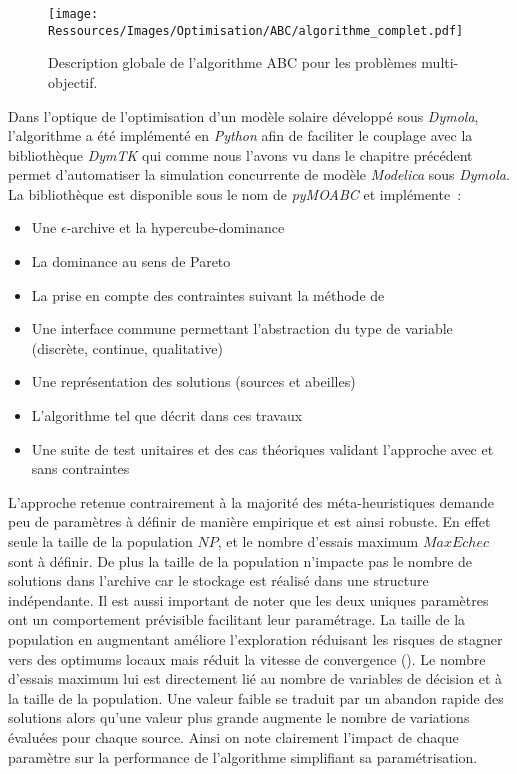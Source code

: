 \begin{figure}
    \centering
    \texttt{[image: Ressources/Images/Optimisation/ABC/algorithme\_complet.pdf]}
    \caption{Description globale de l’algorithme ABC pour les problèmes multi-objectif.}
    \label{fig:abc_complet}
\end{figure}

Dans l’optique de l’optimisation d’un modèle solaire développé sous \textit{Dymola}, l’algorithme
a été implémenté en \textit{Python} afin de faciliter le couplage avec la bibliothèque
\textit{DymTK} qui comme nous l’avons vu dans le chapitre précédent permet d’automatiser
la simulation concurrente de modèle \textit{Modelica} sous \textit{Dymola}. La bibliothèque est
disponible sous le nom de \textit{pyMOABC} et implémente~:
\begin{itemize}
  \item Une $\epsilon$-archive et la hypercube-dominance
  \item La dominance au sens de Pareto
  \item La prise en compte des contraintes suivant la méthode de \textcite{Woldesenbet20073077}
  \item Une interface commune permettant l’abstraction du type de variable (discrète, continue, qualitative)
  \item Une représentation des solutions (sources et abeilles)
  \item L’algorithme tel que décrit dans ces travaux
  \item Une suite de test unitaires et des cas théoriques validant l’approche avec
        et sans contraintes
\end{itemize}

L’approche retenue contrairement à la majorité des méta-heuristiques demande
peu de paramètres à définir de manière empirique et est ainsi robuste. En effet
seule la taille de la population $NP$, et le nombre d’essais maximum $MaxEchec$ sont à définir.
De plus la taille de la population n’impacte pas le nombre de solutions dans l’archive
car le stockage est réalisé dans une structure indépendante. Il est aussi important
de noter que les deux uniques paramètres ont un comportement prévisible facilitant
leur paramétrage. La taille de la population en augmentant améliore l’exploration
réduisant les risques de stagner vers des optimums locaux mais réduit la vitesse
de convergence ().
Le nombre d’essais maximum lui est directement lié au nombre de variables de décision
et à la taille de la population. Une valeur faible se traduit par un abandon rapide
des solutions alors qu’une valeur plus grande augmente le nombre de variations évaluées
pour chaque source. Ainsi on note clairement l’impact de chaque paramètre sur la
performance de l’algorithme simplifiant sa paramétrisation.

